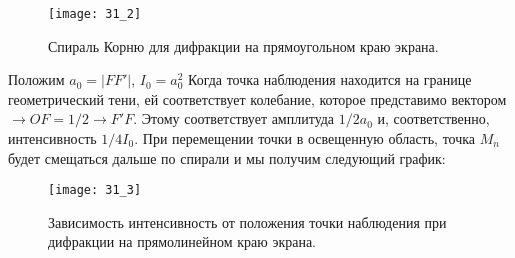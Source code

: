 \begin{figure}[H]
	\centering
	\texttt{[image: 31\_2]}
	\caption{Спираль Корню для дифракции на прямоугольном краю экрана.}
\end{figure}

Положим $a_0 = |F F'|$, $I_0 = a_0^2$ Когда точка наблюдения находится на границе геометрический тени, ей соответствует колебание, которое представимо вектором $\longrightarrow{OF} = 1/2 \longrightarrow{F'F}$. Этому соответствует амплитуда $1/2 a_0$ и, соответственно, интенсивность $1/4 I_0$. При перемещении точки в освещенную область, точка $M_n$ будет смещаться дальше по спирали и мы получим следующий график:

\begin{figure}[H]
	\centering
	\texttt{[image: 31\_3]}
	\caption{Зависимость интенсивность от положения точки наблюдения при дифракции на прямолинейном краю экрана.}
\end{figure}





